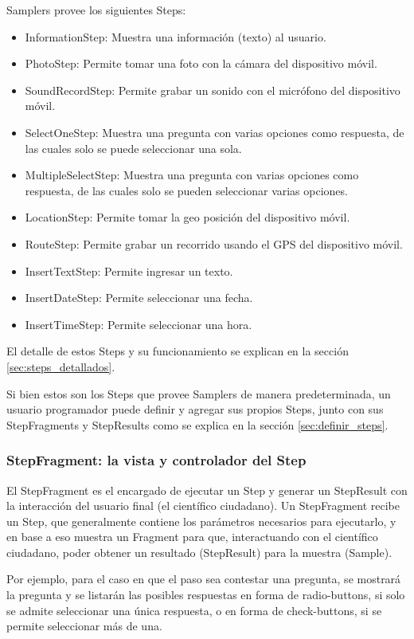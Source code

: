 Samplers provee los siguientes Steps:
\begin{itemize}
	\item InformationStep: Muestra una información (texto) al usuario.
	\item PhotoStep: Permite tomar una foto con la cámara del dispositivo móvil.
	\item SoundRecordStep: Permite grabar un sonido con el micrófono del dispositivo móvil.
	\item SelectOneStep: Muestra una pregunta con varias opciones como respuesta, de las cuales solo se puede seleccionar una sola.
	\item MultipleSelectStep: Muestra una pregunta con varias opciones como respuesta, de las cuales solo se pueden seleccionar varias opciones.
	\item LocationStep: Permite tomar la geo posición del dispositivo móvil.
	\item RouteStep: Permite grabar un recorrido usando el GPS del dispositivo móvil.
	\item InsertTextStep: Permite ingresar un texto.
	\item InsertDateStep: Permite seleccionar una fecha.
	\item InsertTimeStep: Permite seleccionar una hora.
\end{itemize}

El detalle de estos Steps y su funcionamiento se explican en la sección \ref{sec:steps_detallados}.

Si bien estos son los Steps que provee Samplers de manera predeterminada, un usuario programador puede definir y agregar sus propios Steps, junto con sus StepFragments y StepResults como se explica en la sección \ref{sec:definir_steps}.

\subsubsection{StepFragment: la vista y controlador del Step}
El StepFragment es el encargado de ejecutar un Step y generar un StepResult con la interacción del usuario final (el científico ciudadano). Un StepFragment recibe un Step, que generalmente contiene los parámetros necesarios para ejecutarlo, y en base a eso muestra un Fragment para que, interactuando con el científico ciudadano, poder obtener un resultado (StepResult) para la muestra (Sample). 

Por ejemplo, para el caso en que el paso sea contestar una pregunta, se mostrará la pregunta y se listarán las posibles respuestas en forma de radio-buttons, si solo se admite seleccionar una única respuesta, o en forma de check-buttons, si se permite seleccionar más de una.

